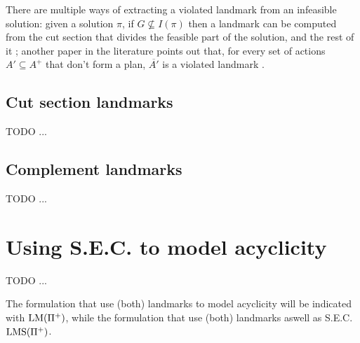 There are multiple ways of extracting a violated landmark from an infeasible solution: given a solution $\pi$, if $G\not\subseteq I(\pi)$ then a landmark can be computed from the cut section that divides the feasible part of the solution, and the rest of it \cite{Bonet_11}; another paper in the literature points out that, for every set of actions $A'\subseteq A^+$ that don't form a plan, $\overline{A'}$ is a violated landmark \cite{MLM_Haslum_12}.

\subsection{Cut section landmarks}
TODO ...

\subsection{Complement landmarks}
TODO ...

\section{Using S.E.C. to model acyclicity}
TODO ...

The formulation that use (both) landmarks to model acyclicity will be indicated with $\mbox{LM}(\Pi^+)$, while the formulation that use (both) landmarks aswell as S.E.C. $\mbox{LMS}(\Pi^+)$.